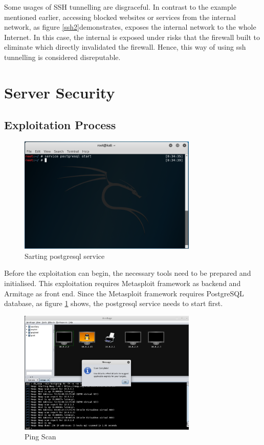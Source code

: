 \documentclass{article}
\begin{document}
Some usages of SSH tunnelling are disgraceful. In contrast to the example mentioned 
earlier, accessing blocked websites or services from the internal network, 
as figure \ref{ssh2}demonstrates, exposes the internal network to the whole Internet. 
In this case, the internal is exposed under risks that the firewall built to eliminate which directly 
invalidated the firewall. Hence, this way of using ssh tunnelling is considered disreputable. 

\section{Server Security}
\label{sec:serversec}

\subsection{Exploitation Process}
\begin{figure}[H]
  \includegraphics[width=8.5cm]{kali1}
  \caption{Sarting postgresql service}
  \label{kali1}
\end{figure}

Before the exploitation can begin, the necessary tools need to be prepared and initialised.
This exploitation requires Metasploit framework as backend and Armitage as front end. Since the 
Metasploit framework requires PostgreSQL database, as figure \ref{kali1} shows, 
the postgresql service needs to start first.

\begin{figure}[H]
  \includegraphics[width=8.5cm]{kali2}
  \caption{Ping Scan}
  \label{kali2}
\end{figure}
\end{document}
